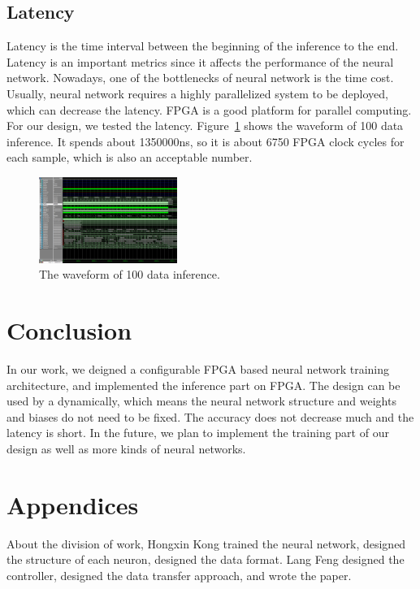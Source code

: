 \documentclass[conference]{IEEEtran}
\begin{document}
\subsection{Latency}

Latency is the time interval between the beginning of the inference to the end. Latency is an important metrics since it affects the performance of the neural network. Nowadays, one of the bottlenecks of neural network is the time cost. Usually, neural network requires a highly parallelized system to be deployed, which can decrease the latency. FPGA is a good platform for parallel computing.
For our design, we tested the latency. Figure~\ref{fig:waveform} shows the waveform of 100 data inference. It spends about 1350000ns, so it is about 6750 FPGA clock cycles for each sample, which is also an acceptable number.

\begin{figure}[!hbt]
	\centering
	\includegraphics[width=0.4\textwidth]{latency.png}
	\caption{The waveform of 100 data inference.}
	\label{fig:waveform}
\end{figure}

\section{Conclusion}
\label{sec:ccl}

In our work, we deigned a configurable FPGA based neural network training architecture, and implemented the inference part on FPGA. The design can be used by a dynamically, which means the neural network structure and weights and biases do not need to be fixed. The accuracy does not decrease much and the latency is short. In the future, we plan to implement the training part of our design as well as more kinds of neural networks.

\section*{Appendices}
About the division of work, Hongxin Kong trained the neural network, designed the structure of each neuron, designed the data format. Lang Feng designed the controller, designed the data transfer approach, and wrote the paper.
\end{document}
